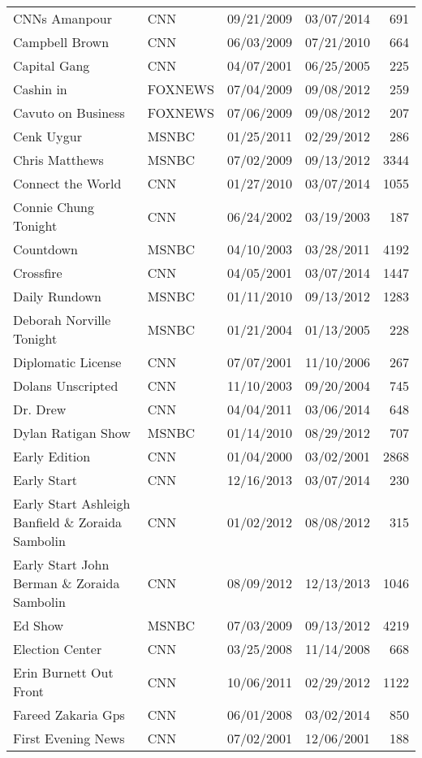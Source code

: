 {\begin{longtable}{llllr}
  CNNs Amanpour & CNN & 09/21/2009 & 03/07/2014 & 691 \\ 
  Campbell Brown & CNN & 06/03/2009 & 07/21/2010 & 664 \\ 
  Capital Gang & CNN & 04/07/2001 & 06/25/2005 & 225 \\ 
  Cashin in & FOXNEWS & 07/04/2009 & 09/08/2012 & 259 \\ 
  Cavuto on Business & FOXNEWS & 07/06/2009 & 09/08/2012 & 207 \\ 
  Cenk Uygur & MSNBC & 01/25/2011 & 02/29/2012 & 286 \\ 
  Chris Matthews & MSNBC & 07/02/2009 & 09/13/2012 & 3344 \\ 
  Connect the World & CNN & 01/27/2010 & 03/07/2014 & 1055 \\ 
  Connie Chung Tonight & CNN & 06/24/2002 & 03/19/2003 & 187 \\ 
  Countdown & MSNBC & 04/10/2003 & 03/28/2011 & 4192 \\ 
  Crossfire & CNN & 04/05/2001 & 03/07/2014 & 1447 \\ 
  Daily Rundown & MSNBC & 01/11/2010 & 09/13/2012 & 1283 \\ 
  Deborah Norville Tonight & MSNBC & 01/21/2004 & 01/13/2005 & 228 \\ 
  Diplomatic License & CNN & 07/07/2001 & 11/10/2006 & 267 \\ 
  Dolans Unscripted & CNN & 11/10/2003 & 09/20/2004 & 745 \\ 
  Dr. Drew & CNN & 04/04/2011 & 03/06/2014 & 648 \\ 
  Dylan Ratigan Show & MSNBC & 01/14/2010 & 08/29/2012 & 707 \\ 
  Early Edition & CNN & 01/04/2000 & 03/02/2001 & 2868 \\ 
  Early Start & CNN & 12/16/2013 & 03/07/2014 & 230 \\ 
  Early Start Ashleigh Banfield \& Zoraida Sambolin & CNN & 01/02/2012 & 08/08/2012 & 315 \\ 
  Early Start John Berman \& Zoraida Sambolin & CNN & 08/09/2012 & 12/13/2013 & 1046 \\ 
  Ed Show & MSNBC & 07/03/2009 & 09/13/2012 & 4219 \\ 
  Election Center & CNN & 03/25/2008 & 11/14/2008 & 668 \\ 
  Erin Burnett Out Front & CNN & 10/06/2011 & 02/29/2012 & 1122 \\ 
  Fareed Zakaria Gps & CNN & 06/01/2008 & 03/02/2014 & 850 \\ 
  First Evening News & CNN & 07/02/2001 & 12/06/2001 & 188 \\ 

\end{longtable}}
